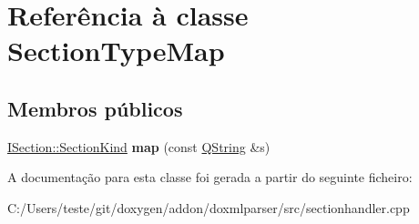 \hypertarget{class_section_type_map}{\section{Referência à classe Section\-Type\-Map}
\label{class_section_type_map}
}
\subsection*{Membros públicos}
\begin{DoxyCompactItemize}
\item 
\hypertarget{class_section_type_map_ab58c10a643d64b67994c97c057f50579}{\hyperlink{class_i_section_a7082fb45267dee090a2ecc569f5b1c9c}{I\-Section\-::\-Section\-Kind} {\bfseries map} (const \hyperlink{class_q_string}{Q\-String} \&s)}\label{class_section_type_map_ab58c10a643d64b67994c97c057f50579}

\end{DoxyCompactItemize}


A documentação para esta classe foi gerada a partir do seguinte ficheiro\-:\begin{DoxyCompactItemize}
\item 
C\-:/\-Users/teste/git/doxygen/addon/doxmlparser/src/sectionhandler.\-cpp\end{DoxyCompactItemize}
